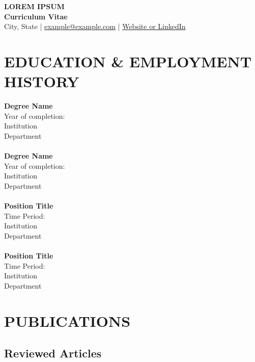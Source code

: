 \documentclass[a4paper,9pt]{extarticle}
\begin{document}
\pagestyle{empty}

\begin{center}
    \textbf{\Large LOREM IPSUM }\\[3pt] %
    \textbf{Curriculum Vitae}\\[1pt] %
    City, State | \href{mailto:example@example.com}{example@example.com} | \href{https://www.linkedin.com/in/loremipsum}{Website or LinkedIn} %
\end{center}

\section*{EDUCATION \& EMPLOYMENT HISTORY}
    \noindent
    \newline
    \textbf{Degree Name} \\
    Year of completion: \\ 
    Institution \\ 
    Department \\
    \lipsum[1][1-4] \\

    \noindent
    \textbf{Degree Name} \\
    Year of completion: \\ 
    Institution \\ 
    Department \\
    \lipsum[1][1-4] \\
    
    \noindent
    \textbf{Position Title} \\
    Time Period: \\
    Institution \\ 
    Department \\
    \lipsum[1][1-4] \\
    
    \noindent
    \textbf{Position Title} \\
    Time Period: \\
    Institution \\ 
    Department \\
    \lipsum[1][1-4] 

\section*{PUBLICATIONS}
    \subsection*{Reviewed Articles}
        \lipsum[1][5-11]
\end{document}

